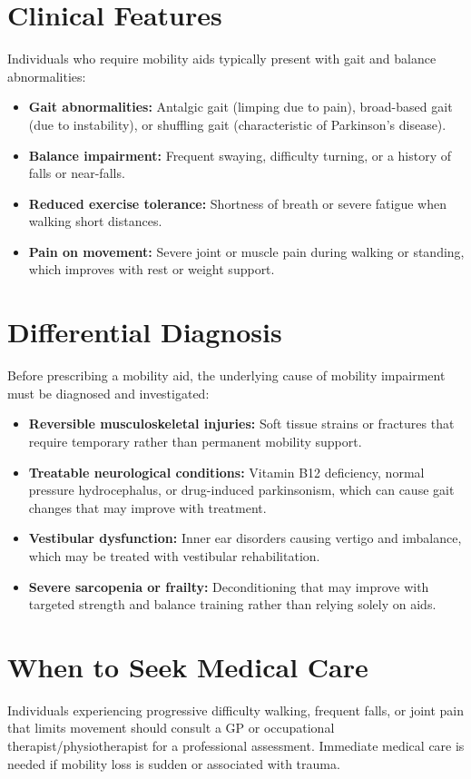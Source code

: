 \section*{Clinical Features}
Individuals who require mobility aids typically present with gait and balance abnormalities:

\begin{itemize}
    \item \textbf{Gait abnormalities:} Antalgic gait (limping due to pain), broad-based gait (due to instability), or shuffling gait (characteristic of Parkinson's disease).
    \item \textbf{Balance impairment:} Frequent swaying, difficulty turning, or a history of falls or near-falls.
    \item \textbf{Reduced exercise tolerance:} Shortness of breath or severe fatigue when walking short distances.
    \item \textbf{Pain on movement:} Severe joint or muscle pain during walking or standing, which improves with rest or weight support.
\end{itemize}

\section*{Differential Diagnosis}
Before prescribing a mobility aid, the underlying cause of mobility impairment must be diagnosed and investigated:

\begin{itemize}
    \item \textbf{Reversible musculoskeletal injuries:} Soft tissue strains or fractures that require temporary rather than permanent mobility support.
    \item \textbf{Treatable neurological conditions:} Vitamin B12 deficiency, normal pressure hydrocephalus, or drug-induced parkinsonism, which can cause gait changes that may improve with treatment.
    \item \textbf{Vestibular dysfunction:} Inner ear disorders causing vertigo and imbalance, which may be treated with vestibular rehabilitation.
    \item \textbf{Severe sarcopenia or frailty:} Deconditioning that may improve with targeted strength and balance training rather than relying solely on aids.
\end{itemize}

\section*{When to Seek Medical Care}
Individuals experiencing progressive difficulty walking, frequent falls, or joint pain that limits movement should consult a GP or occupational therapist/physiotherapist for a professional assessment. Immediate medical care is needed if mobility loss is sudden or associated with trauma.

